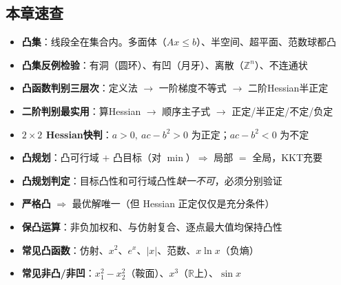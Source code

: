 \clearpage\subsection{本章速查}

\begin{itemize}
  \item \textbf{凸集}：线段全在集合内。多面体（$Ax\le b$）、半空间、超平面、范数球都凸
  \item \textbf{凸集反例检验}：有洞（圆环）、有凹（月牙）、离散（$\mathbb{Z}^n$）、不连通状
  \item \textbf{凸函数判别三层次}：定义法 $\to$ 一阶梯度不等式 $\to$ 二阶Hessian半正定
  \item \textbf{二阶判别最实用}：算Hessian $\to$ 顺序主子式 $\to$ 正定/半正定/不定/负定
  \item \textbf{$2\times2$ Hessian快判}：$a>0,\ ac-b^2>0$ 为正定；$ac-b^2<0$ 为不定
  \item \textbf{凸规划}：凸可行域 $+$ 凸目标（对 $\min$）$\Rightarrow$ 局部 $=$ 全局，KKT充要
  \item \textbf{凸规划判定}：目标凸性和可行域凸性\emph{缺一不可}，必须分别验证
  \item \textbf{严格凸} $\Rightarrow$ 最优解唯一（但 Hessian 正定仅仅是充分条件）
  \item \textbf{保凸运算}：非负加权和、与仿射复合、逐点最大值均保持凸性
  \item \textbf{常见凸函数}：仿射、$x^2$、$e^x$、$|x|$、范数、$x\ln x$（负熵）
  \item \textbf{常见非凸/非凹}：$x_1^2-x_2^2$（鞍面）、$x^3$（$\mathbb{R}$上）、$\sin x$
\end{itemize}
